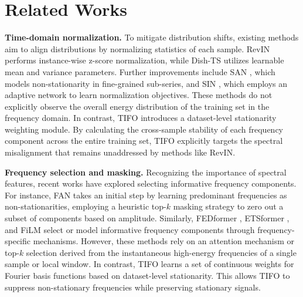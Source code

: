 \documentclass[sigconf,anonymous,review]{acmart}
\newcommand{\methodn}{\textsc{TIFO}}
\newcommand{\method}{\textsc{\methodn}\xspace}
\begin{document}
\section{Related Works}

\textbf{Time-domain normalization.}
To mitigate distribution shifts, existing methods aim to align distributions by normalizing statistics of each sample.
RevIN \citep{kim2021RevIN} performs instance-wise z-score normalization, while Dish-TS \citep{fan2023dish} utilizes learnable mean and variance parameters.
Further improvements include SAN \citep{liu2023SAN}, which models non-stationarity in fine-grained sub-series, and SIN \citep{han2024sin}, which employs an adaptive network to learn normalization objectives.
These methods do not explicitly observe the overall energy distribution of the training set in the frequency domain.
In contrast, \method introduces a dataset-level stationarity weighting module.
By calculating the cross-sample stability of each frequency component across the entire training set, \method explicitly targets the spectral misalignment that remains unaddressed by methods like RevIN.

\noindent\textbf{Frequency selection and masking.}
Recognizing the importance of spectral features, recent works have explored selecting informative frequency components.
For instance, FAN \citep{ye2024FAN} takes an initial step by learning predominant frequencies as non-stationarities, employing a heuristic top-$k$ masking strategy to zero out a subset of components based on amplitude.
Similarly, FEDformer \citep{ICMLFedformer}, ETSformer \citep{Etsformer}, and FiLM \citep{zhou2022film} select or model informative frequency components through frequency-specific mechanisms.
However, these methods rely on an attention mechanism or top-$k$ selection derived from the instantaneous high-energy frequencies of a single sample or local window.
In contrast, \method learns a set of continuous weights for Fourier basis functions based on dataset-level stationarity.
This allows \method to suppress non-stationary frequencies while preserving stationary signals.
\end{document}

